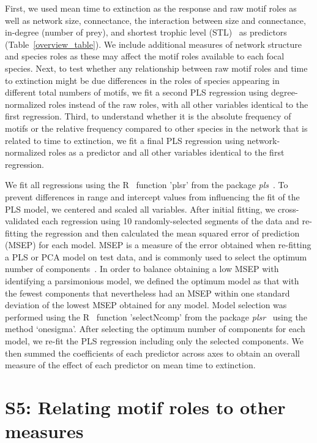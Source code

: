 \documentclass[12pt]{article}
\begin{document}
	
	First, we used mean time to extinction as the response and raw motif roles as well as network size, connectance, the interaction between size and connectance, in-degree (number of prey), and shortest trophic level (STL)~\citep{Hairston1993} as predictors (Table~\ref{overview_table}).
	We include additional measures of network structure and species roles as these may affect the motif roles available to each focal species.
	Next, to test whether any relationship between raw motif roles and time to extinction might be due differences in the roles of species appearing in different total numbers of motifs, we fit a second PLS regression using degree-normalized roles instead of the raw roles, with all other variables identical to the first regression.
	Third, to understand whether it is the absolute frequency of motifs or the relative frequency compared to other species in the network that is related to time to extinction, we fit a final PLS regression using network-normalized roles as a predictor and all other variables identical to the first regression.
	
	
	We fit all regressions using the R~\citep{R} function 'plsr' from the package \emph{pls}~\citep{pls}.
	To prevent differences in range and intercept values from influencing the fit of the PLS model, we centered and scaled all variables.
	After initial fitting, we cross-validated each regression using 10 randomly-selected segments of the data and re-fitting the regression and then calculated the mean squared error of prediction (MSEP) for each model.
	MSEP is a measure of the error obtained when re-fitting a PLS or PCA model on test data, and is commonly used to select the optimum number of components~\citep{Mevik2004}.
	In order to balance obtaining a low MSEP with identifying a parsimonious model, we defined the optimum model as that with the fewest components that nevertheless had an MSEP within one standard deviation of the lowest MSEP obtained for any model.
	Model selection was performed using the R~\citep{R} function 'selectNcomp' from the package \emph{plsr}~\citep{pls} using the method `onesigma'.
	After selecting the optimum number of components for each model, we re-fit the PLS regression including only the selected components. 
	We then summed the coefficients of each predictor across axes to obtain an overall measure of the effect of each predictor on mean time to extinction.

\clearpage


\section*{S5: Relating motif roles to other measures}
\end{document}
